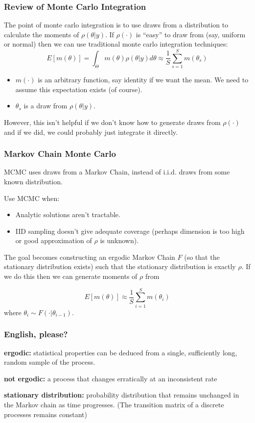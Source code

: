 \documentclass[11pt, aspectratio=169]{beamer}
\begin{document}
\begin{frame}[c]\frametitle{Review of Monte Carlo Integration}
    
The point of monte carlo integration is to use draws from a distribution to calculate the moments of $\rho(\theta|y)$. If $\rho(\cdot)$ is ``easy'' to draw from (say, uniform or normal) then we can use traditional monte carlo integration techniques: 
$$E[m(\theta)] = \int_\Theta m(\theta) \rho(\theta|y) d\theta \approx \frac{1}{S} \sum_{s=1}^S m(\theta_s)$$
\begin{itemize}
\item $m(\cdot)$ is an arbitrary function, say identity if we want the mean. We need to assume this expectation exists (of course).  
\item $\theta_s$ is a draw from $\rho(\theta|y)$. 
\end{itemize}

However, this isn't helpful if we don't know how to generate draws from $\rho(\cdot)$ and if we did, we could probably just integrate it directly. 


\end{frame}



\begin{frame}[c]\frametitle{Markov Chain Monte Carlo}
 
MCMC uses draws from a \alert{Markov Chain}, instead of i.i.d. draws from some known distribution. 

\vspace{.5em} 
Use MCMC when:
\begin{itemize}
\item Analytic solutions aren't tractable. 
\item IID sampling doesn't give adequate coverage (perhaps dimension is too high or good approximation of $\rho$ is unknown). 
\end{itemize}


The goal becomes constructing an \alert{ergodic} Markov Chain $F$ (so that the \alert{stationary distribution} exists) such that the stationary
distribution is exactly $\rho$.  If we do this then we can generate moments of $\rho$ from

$$ E[m(\theta)] \approx \frac{1}{S} \sum_{i=1}^S m(\theta_i) $$
where $\theta_i \sim F(\cdot | \theta_{i-1})$. 

\end{frame}


\begin{frame}[c]\frametitle{English, please?}
    

\textbf{ergodic:} statistical properties can be deduced from a single, sufficiently long, random sample of the process. 

\vspace{2em}
\textbf{not ergodic:} a process that changes erratically at an inconsistent rate

\vspace{2em}
\textbf{stationary distribution:} probability distribution that remains unchanged in the Markov chain as time progresses. (The transition matrix of a discrete processes remains constant)

\end{frame}
\end{document}
